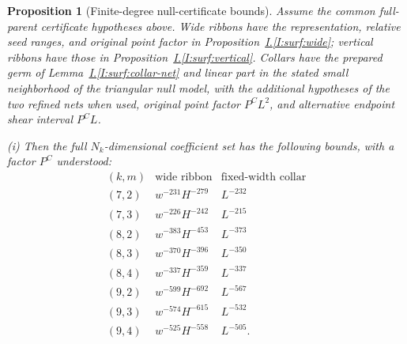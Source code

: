 \documentclass[11pt]{amsart}
\makeatletter
\newtheorem{proposition}[theorem]{Proposition}
\theoremstyle{definition}
\theoremstyle{remark}
\numberwithin{equation}{section}
\newcommand{\equationalias}[1]{\begingroup\protected@edef\@currentlabel{\p@equation\theequation}\protected@edef\@currentHref{equation.\theHequation}\label{#1}\endgroup}
\newcommand{\partIref}[1]{\hyperref[I:#1]{I.\ref*{I:#1}}}
\makeatother
\begin{document}
\begin{proposition}[Finite-degree null-certificate bounds]\label{surf:finite-null-tails}\label{low:78:h3n:wide}\label{low:78:h3n:vertical}\label{low:78:h3n:collar}\label{low:78:s37i:wide}\label{low:78:s37i:vertical}\label{low:78:s37i:collar}\label{low:78:s38o:wide}\label{low:78:s38o:vertical}\label{low:78:s38o:collar}\label{low:78:s38i:wide}\label{low:78:s38i:vertical}\label{low:78:s38i:collar}\label{low:78:d8q:wide}\label{low:78:d8q:vertical}\label{low:78:d8q:collar}\label{low:9:h9d:wide}\label{low:9:h9d:vertical}\label{low:9:u9:collar-tails}
Assume the common full-parent certificate hypotheses above. Wide ribbons have the representation, relative seed ranges, and original point factor in Proposition~\partIref{surf:wide}; vertical ribbons have those in Proposition~\partIref{surf:vertical}. Collars have the prepared germ of Lemma~\partIref{surf:collar-net} and linear part in the stated small neighborhood of the triangular null model, with the additional hypotheses of the two refined nets when used, original point factor $P^CL^2$, and alternative endpoint shear interval $P^CL$.

\noindent\textup{(i)} Then the full $N_k$-dimensional coefficient set has the following bounds, with a factor $P^C$ understood:
\begin{equation}\label{surf:finite-wide-collar}
\begin{array}{c|c|c}
(k,m)&\text{wide ribbon}&\text{fixed-width collar}\\\hline
(7,2)&w^{-231}H^{-279}&L^{-232}\\
(7,3)&w^{-226}H^{-242}&L^{-215}\\
(8,2)&w^{-383}H^{-453}&L^{-373}\\
(8,3)&w^{-370}H^{-396}&L^{-350}\\
(8,4)&w^{-337}H^{-359}&L^{-337}\\
(9,2)&w^{-599}H^{-692}&L^{-567}\\
(9,3)&w^{-574}H^{-615}&L^{-532}\\
(9,4)&w^{-525}H^{-558}&L^{-505}.
\end{array}
\end{equation}
\equationalias{low:78:h3n:wide-tail}


\end{proposition}
\end{document}
